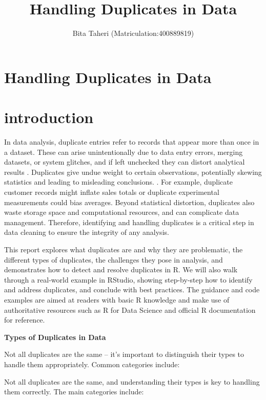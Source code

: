 \documentclass[
  man,
  floatsintext,
  longtable,
  nolmodern,
  notxfonts,
  notimes,
  colorlinks=true,linkcolor=blue,citecolor=blue,urlcolor=blue]{apa7}
\title{Handling Duplicates in Data}
\author{Bita Taheri (Matriculation:400889819)}
\affiliation{
{Hochschule Fresenius - University of Applied Science}}
\begin{document}
\maketitle

\hypertarget{toc}{}
\tableofcontents
\newpage
\section[Introduction]{Handling Duplicates in Data}

\setcounter{secnumdepth}{-\maxdimen} %

\setlength\LTleft{0pt}


\section{introduction}\label{introduction}

In data analysis, duplicate entries refer to records that appear more
than once in a dataset. These can arise unintentionally due to data
entry errors, merging datasets, or system glitches, and if left
unchecked they can distort analytical results . Duplicates give undue
weight to certain observations, potentially skewing statistics and
leading to misleading conclusions. . For example, duplicate customer
records might inflate sales totals or duplicate experimental
measurements could bias averages. Beyond statistical distortion,
duplicates also waste storage space and computational resources, and can
complicate data management. Therefore, identifying and handling
duplicates is a critical step in data cleaning to ensure the integrity
of any analysis.

This report explores what duplicates are and why they are problematic,
the different types of duplicates, the challenges they pose in analysis,
and demonstrates how to detect and resolve duplicates in R. We will also
walk through a real-world example in RStudio, showing step-by-step how
to identify and address duplicates, and conclude with best practices.
The guidance and code examples are aimed at readers with basic R
knowledge and make use of authoritative resources such as R for Data
Science and official R documentation for reference.

\textbf{Types of Duplicates in Data}

Not all duplicates are the same -- it's important to distinguish their
types to handle them appropriately. Common categories include:

Not all duplicates are the same, and understanding their types is key to
handling them correctly. The main categories include:
\end{document}
